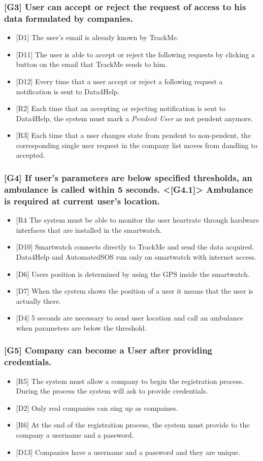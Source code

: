 \documentclass{article}
\begin{document}
\subsubsection{[G3] User can accept or reject the request of access to his data formulated by companies.}
\begin{itemize}
\item {[D1]} The user's email is already known by TrackMe.
\item {[D11]} The user is able to accept or reject the following requests by clicking a button on the email that TrackMe sends to him.
\item {[D12]} Every time that a user accept or reject a following request a notification is sent to Data4Help.
\item {[R2]} Each time that an accepting or rejecting notification is sent to Data4Help, the system must mark a \emph{Pendent User} as not pendent anymore.
\item {[R3]} Each time that a user changes state from pendent to non-pendent, the corresponding single user request in the company list moves from dandling to accepted.
\end{itemize}
\subsubsection{[G4] If user’s parameters are below specified thresholds, an ambulance is called within 5 seconds. <[G4.1]> Ambulance is required at current user’s location.}
\begin{itemize}
\item {[R4} The system must be able to monitor the user heartrate through hardware interfaces that are installed in the smartwatch.
\item {[D10]} Smartwatch connects directly to TrackMe and send the data acquired. Data4Help and AutomatedSOS run only on smartwatch with internet access.
\item {[D6]} Users position is determined by using the GPS inside the smartwatch.
\item {[D7]} When the system shows the position of a user it means that the user is actually there.
\item {[D4]} 5 seconds are necessary to send user location and call an ambulance when parameters are below the threshold.
\end{itemize}
\subsubsection{[G5] Company can become a User after providing credentials.}
\begin{itemize}
\item {[R5]} The system must allow a company to begin the registration process. During the process the system will ask to provide credentials.
\item {[D2]} Only real companies can sing up as compaines.
\item {[R6]} At the end of the registration process, the system must provide to the company a username and a password.
\item {[D13]} Companies have a username and a password and they are unique.
\end{itemize}
\end{document}
